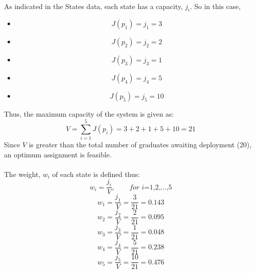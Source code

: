 \documentclass[a4paper,openany]{book}
\begin{document}
			\paragraph{}
				As indicated in the States data, each state has a capacity, $j_i$. So in this case,
				\begin{itemize}
					\item[ ] \[J(p_1) = j_1 = 3\]
					\item[ ] \[J(p_2) = j_2 = 2\]
					\item[ ] \[J(p_3) = j_3 = 1\]
					\item[ ] \[J(p_4) = j_4 = 5\]
					\item[ ] \[J(p_5) = j_5 = 10\]
				\end{itemize}
				Thus, the maximum capacity of the system is given as:
				\begin{equation}
					V = \sum_{i=1}^{5}{J(p_i)} = 3 + 2 + 1 + 5 + 10 = 21
				\end{equation}
			Since $V$ is greater than the total number of graduates awaiting deployment (20), an optimum assignment is feasible.
			\paragraph{}
				The weight, $w_i$ of each state is defined thus:
				\begin{equation}
					w_i = \frac{j_i}{V}, \qquad \textit{for i=1,2,...,5}
				\end{equation}
				\begin{equation}
					w_1 = \frac{j_1}{V} = \frac{3}{21} = 0.143
				\end{equation}
				\begin{equation}
					w_2 = \frac{j_2}{V} = \frac{2}{21} = 0.095
				\end{equation}
				\begin{equation}
					w_3 = \frac{j_3}{V} = \frac{1}{21} = 0.048
				\end{equation}
				\begin{equation}
					w_4 = \frac{j_4}{V} = \frac{5}{21} = 0.238
				\end{equation}
				\begin{equation}
					w_5 = \frac{j_5}{V} = \frac{10}{21} = 0.476
				\end{equation}
\end{document}
